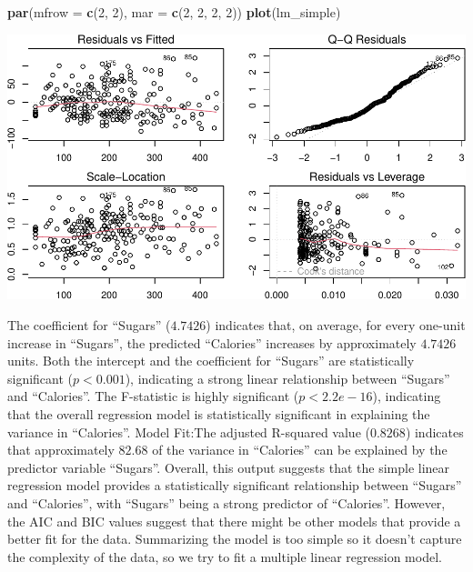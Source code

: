 \documentclass[
]{article}
\newenvironment{Shaded}{\begin{snugshade}}{\end{snugshade}}
\newcommand{\AttributeTok}[1]{\textcolor[rgb]{0.13,0.29,0.53}{#1}}
\newcommand{\DecValTok}[1]{\textcolor[rgb]{0.00,0.00,0.81}{#1}}
\newcommand{\FunctionTok}[1]{\textcolor[rgb]{0.13,0.29,0.53}{\textbf{#1}}}
\newcommand{\NormalTok}[1]{#1}
\begin{document}
\begin{Shaded}
\begin{Highlighting}[]
\FunctionTok{par}\NormalTok{(}\AttributeTok{mfrow =} \FunctionTok{c}\NormalTok{(}\DecValTok{2}\NormalTok{, }\DecValTok{2}\NormalTok{), }\AttributeTok{mar =} \FunctionTok{c}\NormalTok{(}\DecValTok{2}\NormalTok{, }\DecValTok{2}\NormalTok{, }\DecValTok{2}\NormalTok{, }\DecValTok{2}\NormalTok{))}
\FunctionTok{plot}\NormalTok{(lm\_simple)}
\end{Highlighting}
\end{Shaded}

\begin{center}\includegraphics{Statistical_Learning_Final_Report_files/figure-latex/simple_linear_regression-1} \end{center}

The coefficient for ``Sugars'' (\(4.7426\)) indicates that, on average,
for every one-unit increase in ``Sugars'', the predicted ``Calories''
increases by approximately \(4.7426\) units. Both the intercept and the
coefficient for ``Sugars'' are statistically significant
(\(p < 0.001\)), indicating a strong linear relationship between
``Sugars'' and ``Calories''. The F-statistic is highly significant
(\(p < 2.2e-16\)), indicating that the overall regression model is
statistically significant in explaining the variance in ``Calories''.
Model Fit:The adjusted R-squared value (\(0.8268\)) indicates that
approximately \(82.68%
\) of the variance in ``Calories'' can be explained by the predictor
variable ``Sugars''. Overall, this output suggests that the simple
linear regression model provides a statistically significant
relationship between ``Sugars'' and ``Calories'', with ``Sugars'' being
a strong predictor of ``Calories''. However, the AIC and BIC values
suggest that there might be other models that provide a better fit for
the data. Summarizing the model is too simple so it doesn't capture the
complexity of the data, so we try to fit a multiple linear regression
model.
\end{document}
